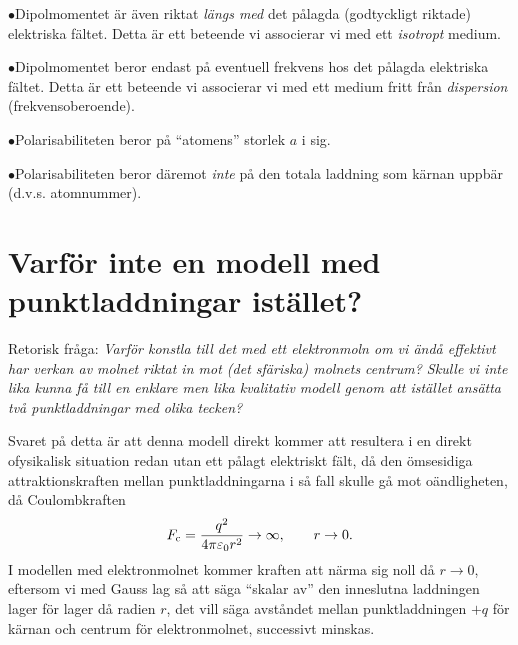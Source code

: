 {{{{\item{$\bullet$}{Dipolmomentet {\"a}r {\"a}ven riktat {\it l{\"a}ngs med} det
                 p{\aa}lagda (godtyckligt riktade) elektriska f{\"a}ltet.
                 Detta {\"a}r ett beteende vi associerar vi med ett
                 {\it isotropt} medium.}
\item{$\bullet$}{Dipolmomentet beror endast p{\aa} eventuell frekvens hos
                 det p{\aa}lagda elektriska f{\"a}ltet. Detta {\"a}r ett
                 beteende vi associerar vi med ett medium fritt fr{\aa}n
                 {\it dispersion} (frekvensoberoende).}
\item{$\bullet$}{Polarisabiliteten beror p{\aa} ``atomens''
                 storlek $a$ i sig.}
\item{$\bullet$}{Polarisabiliteten beror d{\"a}remot {\it inte} p{\aa} den
                 totala laddning som k{\"a}rnan uppb{\"a}r (d.v.s. atomnummer).
                 }
\medskip
\section{Varf{\"o}r inte en modell med punktladdningar ist{\"a}llet?}
Retorisk fr{\aa}ga: {\it Varf{\"o}r konstla till det med ett elektronmoln om vi
{\"a}nd{\aa} effektivt har verkan av molnet riktat in mot (det sf{\"a}riska)
molnets centrum? Skulle vi inte lika kunna f{\aa} till en enklare men lika
kvalitativ modell genom att ist{\"a}llet ans{\"a}tta tv{\aa} punktladdningar
med olika tecken?}

Svaret p{\aa} detta {\"a}r att denna modell direkt kommer att resultera i en
direkt ofysikalisk situa\-tion redan utan ett p{\aa}lagt elektriskt f{\"a}lt,
d{\aa} den {\"o}msesidiga attraktionskraften mellan punktladdningarna i s{\aa}
fall skulle g{\aa} mot o{\"a}ndligheten, d{\aa} Coulombkraften
$$
  F_{\rm c}={{q^2}\over{4\pi\varepsilon_0 r^2}}\to\infty,\qquad r\to 0.
$$
I modellen med elektronmolnet kommer kraften att n{\"a}rma sig noll d{\aa}
$r\to 0$, eftersom vi med Gauss lag s{\aa} att s{\"a}ga ``skalar av'' den
inneslutna laddningen lager f{\"o}r lager d{\aa} radien $r$, det vill s{\"a}ga
avst{\aa}ndet mellan punktladdningen $+q$ f{\"o}r k{\"a}rnan och centrum
f{\"o}r elektronmolnet, successivt minskas.
\vfill\eject

}}}}
